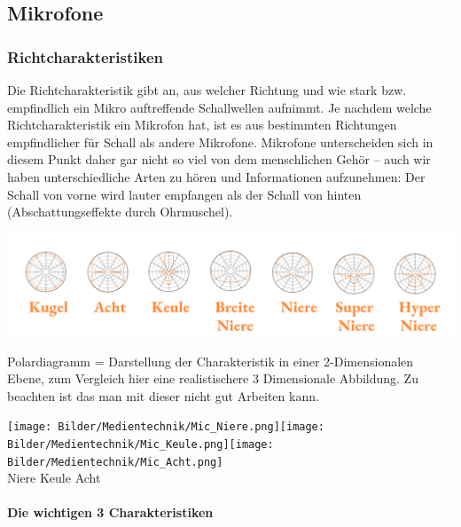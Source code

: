 \subsection{Mikrofone}
    \subsubsection{Richtcharakteristiken}
Die Richtcharakteristik gibt an, aus welcher Richtung und wie stark bzw. empfindlich ein Mikro auftreffende Schallwellen aufnimmt. Je nachdem welche Richtcharakteristik ein Mikrofon hat, ist es aus bestimmten Richtungen empfindlicher für Schall als andere Mikrofone. Mikrofone unterscheiden sich in diesem Punkt daher gar nicht so viel von dem menschlichen Gehör – auch wir haben unterschiedliche Arten zu hören und Informationen aufzunehmen: Der Schall von vorne wird lauter empfangen als der Schall von hinten (Abschattungseffekte durch Ohrmuschel).\cite{BeyerRichtchar}
\begin{center}
    \includegraphics[width=1\textwidth]{Bilder/Medientechnik/Mikrocharakteristik.png}
\end{center}

Polardiagramm = Darstellung der Charakteristik in einer 2-Dimensionalen Ebene, zum Vergleich hier eine realistischere 3 Dimensionale Abbildung. Zu beachten ist das man mit dieser nicht gut Arbeiten kann.

\begin{center}
    \texttt{[image: Bilder/Medientechnik/Mic\_Niere.png]}\hspace{3mm}\texttt{[image: Bilder/Medientechnik/Mic\_Keule.png]}\hspace{3mm}\texttt{[image: Bilder/Medientechnik/Mic\_Acht.png]}\\
    Niere \hspace{3.2cm} Keule \hspace{3.2cm} Acht
\end{center}

\paragraph{Die wichtigen 3 Charakteristiken}~\\

